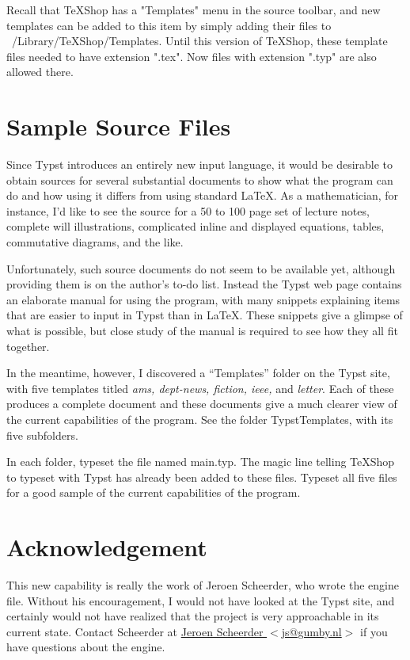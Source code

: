 \documentclass[11pt, oneside]{article}   	%
\begin{document}
Recall that TeXShop has a "Templates" menu in the source toolbar, and new templates can be added to this
item by simply adding their files to ~/Library/TeXShop/Templates. Until this version of TeXShop, these template
files needed to have extension ".tex". Now files with extension ".typ" are also allowed there.

\newpage
\section{Sample Source Files}

Since Typst introduces an entirely new input language, it would be desirable to obtain sources for several substantial documents to show what the program can do and how using it differs from using standard LaTeX.  As a mathematician, 
for instance, I'd like to see the source for a 50 to 100 page set of lecture notes, complete will illustrations, complicated inline and displayed equations, tables, commutative diagrams, and the like.

Unfortunately, such source documents do not seem to be available yet, although providing them is on the author's to-do list. Instead the Typst web page contains an elaborate manual for using the program, with many snippets explaining items that are easier to input in Typst than in LaTeX.  These snippets give a glimpse of what is possible, but close study
of the manual is required to see how they all fit together.

In the meantime, however, I discovered a ``Templates'' folder on the Typst site, with five templates titled
{\em ams, dept-news, fiction, ieee,} and {\em letter}. Each of these produces a complete document  and these documents give a much clearer view of the current capabilities of the program.  See the folder TypstTemplates, with its five subfolders.

In each folder, typeset the file named main.typ. The magic line telling TeXShop to typeset with Typst has already
been added to these files. Typeset all five files for a good sample of the current capabilities of the program.

\section{Acknowledgement}

This new capability is really the work of Jeroen Scheerder, who wrote the engine file. Without his encouragement, I would not have  looked at the Typst site,  and certainly would not have realized that the project is very approachable in its current state. Contact Scheerder at \href{mailto:js@gumby.nl}{Jeroen Scheerder $<$js@gumby.nl$>$} if you have questions about the engine.
\end{document}
